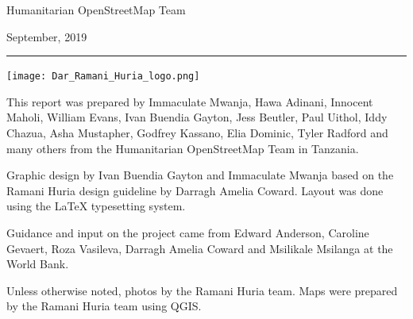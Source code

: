 \documentclass[a4paper,12pt,twoside]{article}
\begin{document}
\begin{center}
  Humanitarian OpenStreetMap Team
  \
  
  September, 2019
\end{center}
\medskip
\begin{center}
\color{RHblue}\rule{\textwidth}{0.5cm}
\end{center}

\newpage
\color{RHgrey}

\begin{center}
{\texttt{[image: Dar\_Ramani\_Huria\_logo.png]}}
\end{center}

This report was prepared by Immaculate Mwanja, Hawa Adinani, Innocent Maholi, William Evans, Ivan Buendia Gayton, Jess Beutler, Paul Uithol, Iddy Chazua, Asha Mustapher, Godfrey Kassano, Elia Dominic, Tyler Radford and many others from the Humanitarian OpenStreetMap Team in Tanzania.

Graphic design by Ivan Buendia Gayton and Immaculate Mwanja based on the Ramani Huria design guideline by Darragh Amelia Coward. Layout was done using the \LaTeX{} typesetting system.

Guidance and input on the project came from Edward Anderson, Caroline Gevaert, Roza Vasileva, Darragh Amelia Coward and Msilikale Msilanga at the World Bank.

Unless otherwise noted, photos by the Ramani Huria team. Maps were prepared by the Ramani Huria team using QGIS.


\bigskip\bigskip\bigskip\bigskip\bigskip
\end{document}
